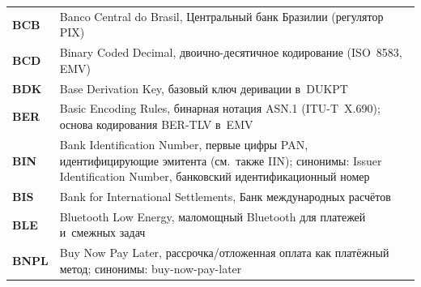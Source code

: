 \begin{longtable}{@{}p{4.5em}p{\dimexpr\linewidth-4.5em-2\tabcolsep\relax}@{}}
  \textbf{BCB}               & Banco Central do Brasil, Центральный банк Бразилии (регулятор PIX)                                                                                                                                                                                                                               \\
  \textbf{BCD}               & Binary Coded Decimal, двоично-десятичное кодирование (ISO~8583, EMV)                                                                                                                                                                                                                             \\
  \textbf{BDK}               & Base Derivation Key, базовый ключ деривации в~DUKPT                                                                                                                                                                                                                                              \\
  \textbf{BER}               & Basic Encoding Rules, бинарная нотация ASN.1 (ITU-T~X.690); основа кодирования BER-TLV в~EMV                                                                                                                                                                                                    \\
  \textbf{BIN}               & Bank Identification Number, первые цифры PAN, идентифицирующие эмитента (см.~также IIN); синонимы: Issuer Identification Number, банковский идентификационный номер                                                                                                                               \\
  \textbf{BIS}               & Bank for International Settlements, Банк международных расчётов                                                                                                                                                                                                                                  \\
  \textbf{BLE}               & Bluetooth Low Energy, маломощный Bluetooth для платежей и~смежных задач                                                                                                                                                                                                                          \\
  \textbf{BNPL}              & Buy Now Pay Later, рассрочка/отложенная оплата как платёжный метод; синонимы: buy-now-pay-later                                                                                                                                                                                                  \\

\end{longtable}
